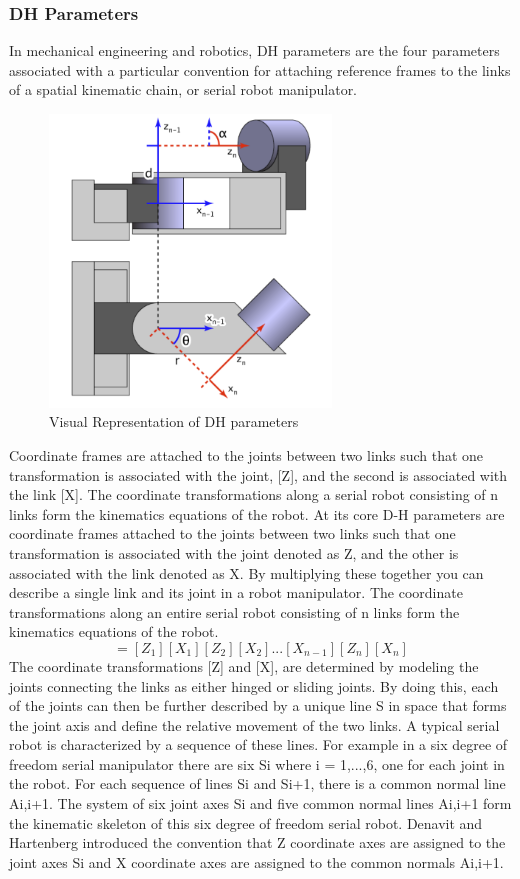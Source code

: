     \subsubsection{DH Parameters}
    In mechanical engineering and robotics, DH parameters are the four parameters associated with a particular convention for attaching reference frames to the links of a spatial kinematic chain, or serial robot manipulator.
     \begin{figure}[H]
        \centering
        \includegraphics[width=75mm]{Dh.PNG}
        \caption{Visual Representation of DH parameters}
        \label{fig:my_label}
    \end{figure}
    Coordinate frames are attached to the joints between two links such that one transformation is associated with the joint, [Z], and the second is associated with the link [X]. The coordinate transformations along a serial robot consisting of n links form the kinematics equations of the robot. At its core D-H parameters are coordinate frames attached to the joints between two links such that one transformation is associated with the joint denoted as Z, and the other is associated with the link denoted as X. By multiplying these together you can describe a single link and its joint in a robot manipulator. The coordinate transformations along an entire serial robot consisting of n links form the kinematics equations of the robot.
    \begin{equation}
    [T] = [Z_1][X_1][Z_2][X_2]...[X_{n-1}][Z_n][X_n]
    \end{equation}
    The coordinate transformations [Z] and [X], are determined by modeling the joints connecting the links as either hinged or sliding joints. By doing this, each of the joints can then be further described by a unique line S in space that forms the joint axis and define the relative movement of the two links. A typical serial robot is characterized by a sequence of these lines. For example in a six degree of freedom serial manipulator there are six Si where i = 1,...,6, one for each joint in the robot. For each sequence of lines Si and Si+1, there is a common normal line Ai,i+1. The system of six joint axes Si and five common normal lines Ai,i+1 form the kinematic skeleton of this six degree of freedom serial robot. Denavit and Hartenberg introduced the convention that Z coordinate axes are assigned to the joint axes Si and X coordinate axes are assigned to the common normals Ai,i+1.

